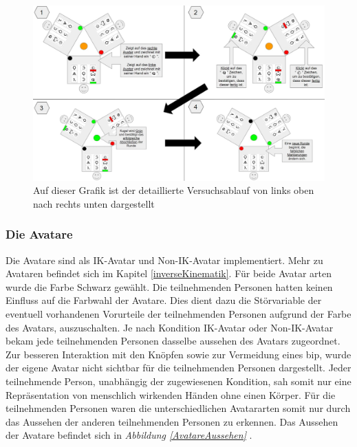 \documentclass[a4paper,11pt]{article}%
\renewcommand{\\}{\vspace*{0.5\baselineskip} \newline}
\begin{document}
	\begin{figure}[h]
		\begin{footnotesize}
		\centering
			\includegraphics[scale=0.30]{Abbildungen/DetaillierterVersuchsablauf.JPG}\\
			\caption[Abbildung 1]{Auf dieser Grafik ist der detaillierte Versuchsablauf von links oben nach rechts unten dargestellt}
			\label{DetaillierterVersuchsablauf}
		\end{footnotesize}
	\end{figure}

	\subsubsection{Die Avatare}
\label{IKNIK}
Die Avatare sind als \dq{}IK-Avatar\dq{} und \dq{}Non-IK-Avatar\dq{} implementiert. Mehr zu Avataren befindet sich im Kapitel \ref{inverseKinematik}.
Für beide Avatar arten wurde die Farbe Schwarz gewählt. Die teilnehmenden Personen hatten keinen Einfluss auf die Farbwahl der Avatare. Dies dient dazu die Störvariable der eventuell vorhandenen Vorurteile der teilnehmenden Personen aufgrund der Farbe des Avatars, auszuschalten. Je nach Kondition \dq{}IK-Avatar\dq{} oder \dq{}Non-IK-Avatar\dq{} bekam jede teilnehmenden Personen dasselbe aussehen des Avatars zugeordnet. Zur besseren Interaktion mit den Knöpfen sowie zur Vermeidung eines \ac{bip}, wurde der eigene Avatar nicht sichtbar für die teilnehmenden Personen dargestellt. Jeder teilnehmende Person, unabhängig der zugewiesenen Kondition,  sah somit nur eine Repräsentation von menschlich wirkenden Händen ohne einen Körper. Für die teilnehmenden Personen waren die unterschiedlichen Avatararten somit nur durch das Aussehen der \dq{}anderen\dq{} teilnehmenden Personen zu erkennen. Das Aussehen der Avatare befindet sich in \textit{Abbildung \ref{AvatareAussehen} }.
\end{document}
